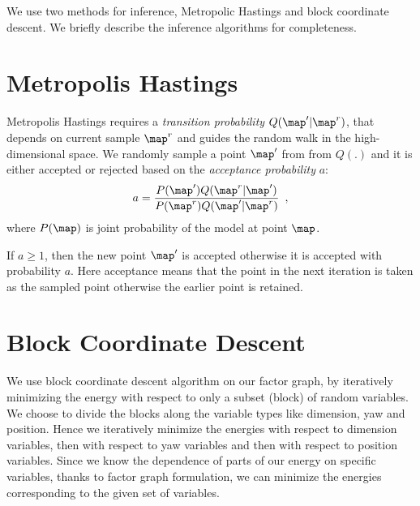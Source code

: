 We use two methods for inference, Metropolic Hastings and block coordinate descent. We briefly describe the inference algorithms for completeness.

\section{Metropolis Hastings}
Metropolis Hastings requires a \emph{transition probability} $Q(\map'|
\map^r)$, that depends on current sample $\map^r$ and guides
the random walk in the high-dimensional space. We randomly sample a point
$\map'$ from from $Q(.)$ and it is either accepted or rejected based on the
\emph{acceptance probability} $a$:
\begin{align}
  a = \frac{P(\map')Q(\map^r| \map')}
  {P(\map^r)Q(\map'| \map^r)}
  \enspace,
\end{align}
where $P(\map)$ is joint probability of the model at point $\map$.

If $a \ge 1$, then the new point $\map'$ is accepted otherwise it is accepted
with probability $a$. Here acceptance means that the point in the next
iteration is taken as the sampled point otherwise the earlier point is retained.

\section{Block Coordinate Descent}

We use block coordinate descent algorithm on our factor graph, by iteratively
minimizing the energy with respect to only a subset (block) of random 
variables. We choose to divide the blocks along the
variable types like dimension, yaw and position. Hence we iteratively minimize the energies with respect to dimension variables, then with respect to yaw variables and then with respect to position variables. Since we know the dependence of parts of our energy on specific variables, thanks to factor graph formulation, we can minimize the energies corresponding to the given set of variables.
